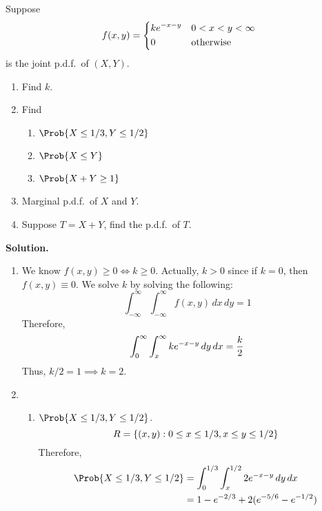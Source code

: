 \begin{Example}{}{}
    Suppose
    \[ f(x,y)=\begin{dcases}
            ke^{-x-y} & 0<x<y<\infty     \\
            0         & \text{otherwise}
        \end{dcases} \]
    is the joint p.d.f.\ of $ (X,Y) $.
    \begin{enumerate}[label=(\roman*)]
        \item Find $ k $.
        \item Find
              \begin{enumerate}[label=(\alph*)]
                  \item $ \Prob{X\le 1/3,Y\le 1/2} $
                  \item $ \Prob{X\le Y} $
                  \item $ \Prob{X+Y\ge 1} $
              \end{enumerate}
        \item Marginal p.d.f.\ of $ X $ and $ Y $.
        \item Suppose $ T=X+Y $, find the p.d.f.\ of $ T $.
    \end{enumerate}
    \textbf{Solution.}
    \begin{enumerate}[label=(\roman*)]
        \item We know $ f(x,y)\ge 0\iff k\ge 0 $. Actually,
              $ k>0 $ since if $ k=0 $, then $ f(x,y)\equiv 0 $.
              We solve $ k $ by solving the following:
              \[ \int_{-\infty}^{\infty} \int_{-\infty}^{\infty} f(x,y)\, d{x} \, d{y} =1 \]
              Therefore,
              \[
                  \int_{0}^{\infty} \int_{x}^{\infty} ke^{-x-y}\, d{y} \, d{x}                     \\
                  =\frac{k}{2}
              \]
              Thus, $ k/2=1\implies k=2 $.
        \item \begin{enumerate}[label=(\alph*)]
                  \item $ \Prob{X\le 1/3,Y\le 1/2} $.
                        \[ R=\{(x,y):0\le x\le 1/3, x\le y\le 1/2\} \]
                        Therefore,
                        \begin{align*}
                            \Prob{X\le 1/3,Y\le 1/2}
                             & =\int_{0}^{1/3} \int_{x}^{1/2} 2e^{-x-y}\, d{y} \, d{x} \\
                             & =1-e^{-2/3}+2(e^{-5/6}-e^{-1/2})                        \\

\end{align*}
\end{enumerate}
\end{enumerate}
\end{Example}
